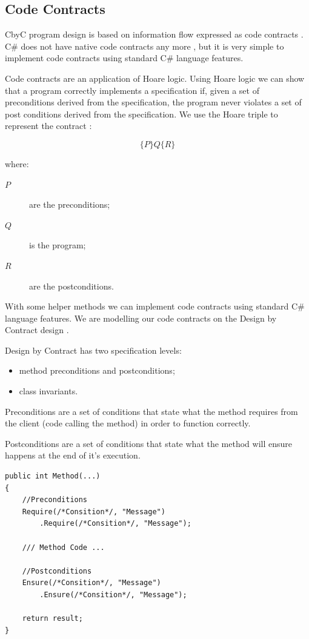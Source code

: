 \subsection{Code Contracts}

CbyC program design is based on information flow expressed as code contracts 
\parencite{CbyCMan}. C\# does not have native code contracts any more \parencite{NoCodeContracts},
but it is very simple to implement code contracts using standard C\# language features.

Code contracts are an application of Hoare logic. Using Hoare logic
we can show that a program correctly implements a specification if, given a set of 
preconditions derived from the specification, the program never violates a set of
post conditions derived from the specification. We use the Hoare triple to 
represent the contract \parencite{BasisForProgramming}:

\[
	\{P\}Q\{R\}
\]

where:
\begin{description}
	\item [\(P\)] are the preconditions;
	\item [\(Q\)] is the program;
	\item [\(R\)] are the postconditions.
\end{description}

With some helper methods we can implement code contracts using standard C\# language
features. We are modelling our code contracts on the Design by Contract design 
\parencite{ObjectOrientedSoftwareConstruction}.

Design by Contract has two specification levels:
\begin{itemize}
	\item method preconditions and postconditions;
	\item class invariants.
\end{itemize}

Preconditions are a set of conditions that state what the method requires from 
the client (code calling the method) in order to function correctly.

Postconditions are a set of conditions that state what the method will ensure 
happens at the end of it's execution.

\begin{lstlisting}[frame=single]
public int Method(...)
{
    //Preconditions
    Require(/*Consition*/, "Message")
        .Require(/*Consition*/, "Message");
        
    /// Method Code ...
    
    //Postconditions
    Ensure(/*Consition*/, "Message")
        .Ensure(/*Consition*/, "Message");

    return result;
}
\end{lstlisting}

